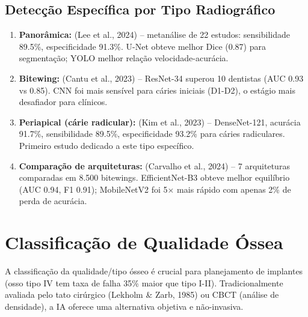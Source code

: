 \subsection{Detecção Específica por Tipo Radiográfico}

\begin{enumerate}
  \item \textbf{Panorâmica:}  (Lee et al., 2024) --
        metanálise de 22 estudos: sensibilidade 89.5\%, especificidade 91.3\%.
        U-Net obteve melhor Dice (0.87) para segmentação; YOLO melhor relação
        velocidade-acurácia.

  \item \textbf{Bitewing:}  (Cantu et al., 2023) --
        ResNet-34 superou 10 dentistas (AUC 0.93 vs 0.85). CNN foi mais sensível
        para cáries iniciais (D1-D2), o estágio mais desafiador para clínicos.

  \item \textbf{Periapical (cárie radicular):}  (Kim et al.,
        2023) -- DenseNet-121, acurácia 91.7\%, sensibilidade 89.5\%,
        especificidade 93.2\% para cáries radiculares. Primeiro estudo dedicado
        a este tipo específico.

  \item \textbf{Comparação de arquiteturas:}  (Carvalho et al.,
        2024) -- 7 arquiteturas comparadas em 8.500 bitewings. EfficientNet-B3
        obteve melhor equilíbrio (AUC 0.94, F1 0.91); MobileNetV2 foi 5$\times$
        mais rápido com apenas 2\% de perda de acurácia.
\end{enumerate}


\section{Classificação de Qualidade Óssea}
\label{sec:qualidade-ossea}

A classificação da qualidade/tipo ósseo é crucial para planejamento de implantes
(osso tipo IV tem taxa de falha 35\% maior que tipo I-II). Tradicionalmente
avaliada pelo tato cirúrgico (Lekholm \& Zarb, 1985) ou CBCT (análise de
densidade), a IA oferece uma alternativa objetiva e não-invasiva.

